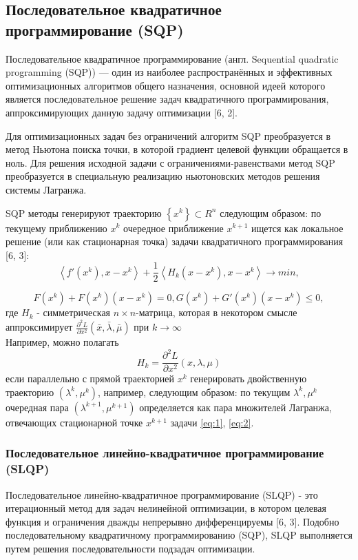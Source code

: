 \documentclass[12pt,a4paper]{article}
\begin{document}
	\subsection{Последовательное квадратичное программирование (SQP)}	
	Последовательное квадратичное программирование (англ. Sequential quadratic\\programming (SQP)) — один из наиболее распространённых и эффективных оптимизационных алгоритмов общего назначения, основной идеей которого является последовательное решение задач квадратичного программирования, аппроксимирующих данную задачу оптимизации [6, 2].
	
	Для оптимизационных задач без ограничений алгоритм SQP преобразуется в метод Ньютона поиска точки, в которой градиент целевой функции обращается в ноль. Для решения исходной задачи с ограничениями-равенствами метод SQP преобразуется в специальную реализацию ньютоновских методов решения системы Лагранжа.
	
	SQP методы генерируют траекторию $\left\lbrace x^k \right\rbrace \subset R^n$ следующим образом: по текущему приближению $x^k$  очередное приближение $x^{k+1}$ ищется как локальное решение (или как стационарная точка) задачи квадратичного программирования [6, 3]:
	\begin{equation}\label{eq:1}
		\left\langle f'(x^k), x-x^k \right\rangle  + \frac{1}{2}\left\langle H_k(x-x^k), x-x^k \right\rangle \longrightarrow min,
	\end{equation}
	
	\begin{equation}\label{eq:2}
		F(x^k)+F(x^k)(x-x^k)=0, G(x^k)+G'(x^k)(x-x^k) \leq 0,
	\end{equation}
	где $H_k$ - симметрическая $n \times n$-матрица, которая в некотором смысле аппроксимирует $\frac{\partial^2 L}{\partial x^2}(\bar{x}, \bar{\lambda}, \bar{\mu})$ при $k\longrightarrow\infty$\\ Например, можно полагать
	\begin{equation}
		H_k = \frac{\partial^2 L}{\partial x^2}(x, \lambda, \mu)
	\end{equation}
	если параллельно с прямой траекторией ${x^k}$ генерировать двойственную траекторию ${(\lambda^k, \mu^k)}$,
	например, следующим образом: по текущим $\lambda^k, \mu^k$ очередная пара $(\lambda^{k+1}, \mu^{k+1})$ определяется как пара множителей Лагранжа, отвечающих стационарной точке $x^{k+1}$ задачи \ref{eq:1}, \ref{eq:2}. 
	
	\subsubsection{Последовательное линейно-квадратичное программирование (SLQP)}
	Последовательное линейно-квадратичное программирование (SLQP) - это итерационный метод для задач нелинейной оптимизации, в котором целевая функция и ограничения дважды непрерывно дифференцируемы [6, 3]. Подобно последовательному квадратичному программированию (SQP), SLQP выполняется путем решения последовательности подзадач оптимизации. 
	
\end{document}
